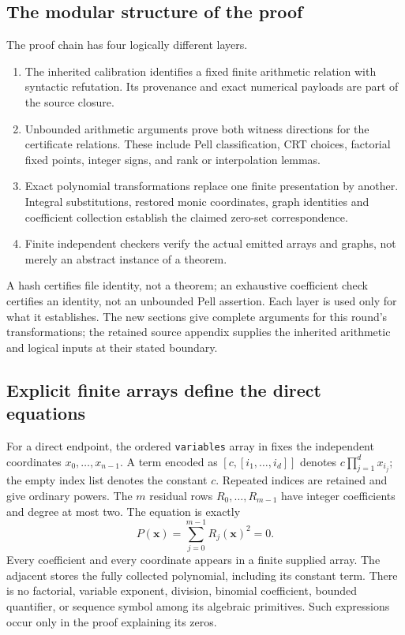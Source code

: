 \subsection{The modular structure of the proof}
The proof chain has four logically different layers.
\begin{enumerate}
\item The inherited calibration identifies a fixed finite arithmetic relation
with syntactic refutation. Its provenance and exact numerical payloads are
part of the source closure.
\item Unbounded arithmetic arguments prove both witness directions for the
certificate relations. These include Pell classification, CRT choices,
factorial fixed points, integer signs, and rank or interpolation lemmas.
\item Exact polynomial transformations replace one finite presentation by
another. Integral substitutions, restored monic coordinates, graph identities
and coefficient collection establish the claimed zero-set correspondence.
\item Finite independent checkers verify the actual emitted arrays and graphs,
not merely an abstract instance of a theorem.
\end{enumerate}
A hash certifies file identity, not a theorem; an exhaustive coefficient
check certifies an identity, not an unbounded Pell assertion. Each layer is
used only for what it establishes. The new sections give complete arguments
for this round's transformations; the retained source appendix supplies
the inherited arithmetic and logical inputs at their stated boundary.

\subsection{Explicit finite arrays define the direct equations}
For a direct endpoint, the ordered \texttt{variables} array in
 fixes the independent coordinates
$x_0,\ldots,x_{n-1}$. A term encoded as $[c,[i_1,\ldots,i_d]]$ denotes
$c\prod_{j=1}^{d}x_{i_j}$; the empty index list denotes the constant $c$.
Repeated indices are retained and give ordinary powers. The $m$ residual
rows $R_0,\ldots,R_{m-1}$ have integer coefficients and degree at most two.
The equation is exactly
\begin{equation}\label{eq:sos}
 P(\boldsymbol{x})=\sum_{j=0}^{m-1}R_j(\boldsymbol{x})^2=0.
\end{equation}
Every coefficient and every coordinate appears in a finite supplied array.
The adjacent  stores the fully collected
polynomial, including its constant term. There is no factorial, variable
exponent, division, binomial coefficient, bounded quantifier, or sequence
symbol among its algebraic primitives. Such expressions occur only in the
proof explaining its zeros.

